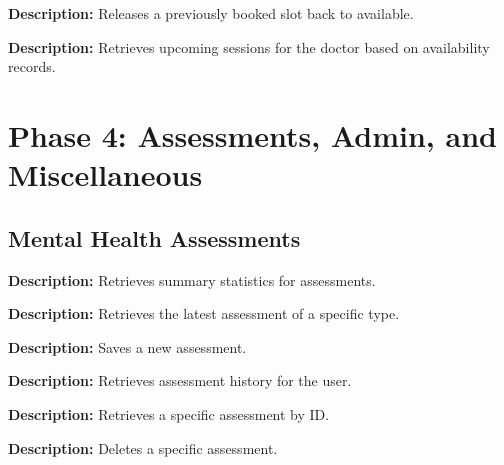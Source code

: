 \documentclass{article}
\begin{document}
\begin{tcolorbox}[title=\textcolor{accent}{POST} /api/availability/release-slot]
\textbf{Description:} Releases a previously booked slot back to available.
\end{tcolorbox}

\begin{tcolorbox}[title=\textcolor{accent}{GET} /api/availability/upcoming-sessions]
\textbf{Description:} Retrieves upcoming sessions for the doctor based on availability records.
\end{tcolorbox}

\section{Phase 4: Assessments, Admin, and Miscellaneous}

\subsection{Mental Health Assessments}

\begin{tcolorbox}[title=\textcolor{accent}{GET} /api/assessments/stats/summary]
\textbf{Description:} Retrieves summary statistics for assessments.
\end{tcolorbox}

\begin{tcolorbox}[title=\textcolor{accent}{GET} /api/assessments/latest/:testType]
\textbf{Description:} Retrieves the latest assessment of a specific type.
\end{tcolorbox}

\begin{tcolorbox}[title=\textcolor{accent}{POST} /api/assessments]
\textbf{Description:} Saves a new assessment.
\end{tcolorbox}

\begin{tcolorbox}[title=\textcolor{accent}{GET} /api/assessments]
\textbf{Description:} Retrieves assessment history for the user.
\end{tcolorbox}

\begin{tcolorbox}[title=\textcolor{accent}{GET} /api/assessments/:id]
\textbf{Description:} Retrieves a specific assessment by ID.
\end{tcolorbox}

\begin{tcolorbox}[title=\textcolor{accent}{DELETE} /api/assessments/:id]
\textbf{Description:} Deletes a specific assessment.
\end{tcolorbox}
\end{document}

